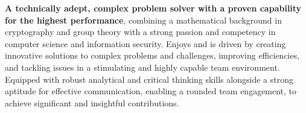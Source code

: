 
\cvsection{$\sim$/}


\begin{cventries}


\cventry
{} %
{} %
{} %
{} %
{ %
\textbf{A technically adept, complex problem solver with a proven capability for the highest performance}, combining a mathematical background in cryptography and group theory with a strong passion and competency in computer science and information security. Enjoys and is driven by creating innovative solutions to complex problems and challenges, improving efficiencies, and tackling issues in a stimulating and highly capable team environment. Equipped with robust analytical and critical thinking skills alongside a strong aptitude for effective communication, enabling a rounded team engagement, to achieve significant and insightful contributions.
}


\end{cventries}